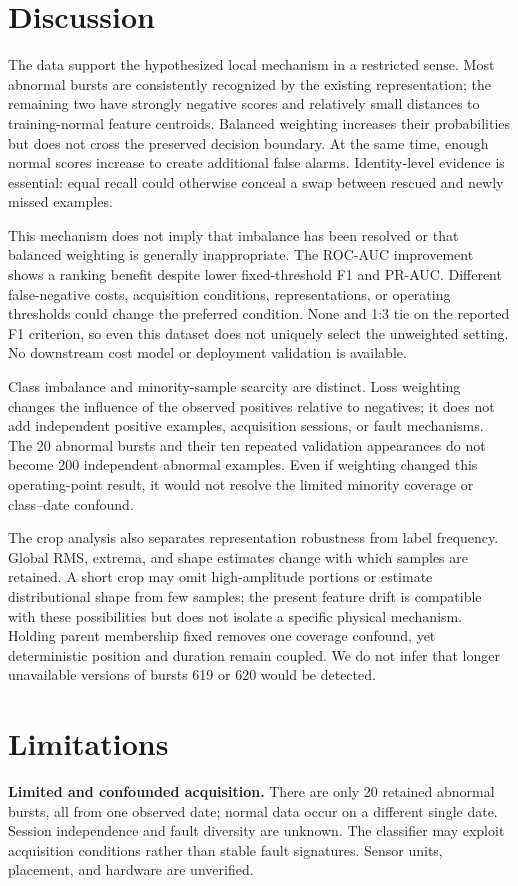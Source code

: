 \documentclass[10pt,twocolumn,letterpaper]{article}
\begin{document}
\section{Discussion}
The data support the hypothesized local mechanism in a restricted sense. Most abnormal bursts are consistently recognized by the existing representation; the remaining two have strongly negative scores and relatively small distances to training-normal feature centroids. Balanced weighting increases their probabilities but does not cross the preserved decision boundary. At the same time, enough normal scores increase to create additional false alarms. Identity-level evidence is essential: equal recall could otherwise conceal a swap between rescued and newly missed examples.

This mechanism does not imply that imbalance has been resolved or that balanced weighting is generally inappropriate. The ROC-AUC improvement shows a ranking benefit despite lower fixed-threshold F1 and PR-AUC. Different false-negative costs, acquisition conditions, representations, or operating thresholds could change the preferred condition. None and 1:3 tie on the reported F1 criterion, so even this dataset does not uniquely select the unweighted setting. No downstream cost model or deployment validation is available.

Class imbalance and minority-sample scarcity are distinct. Loss weighting changes the influence of the observed positives relative to negatives; it does not add independent positive examples, acquisition sessions, or fault mechanisms. The 20 abnormal bursts and their ten repeated validation appearances do not become 200 independent abnormal examples. Even if weighting changed this operating-point result, it would not resolve the limited minority coverage or class--date confound.

The crop analysis also separates representation robustness from label frequency. Global RMS, extrema, and shape estimates change with which samples are retained. A short crop may omit high-amplitude portions or estimate distributional shape from few samples; the present feature drift is compatible with these possibilities but does not isolate a specific physical mechanism. Holding parent membership fixed removes one coverage confound, yet deterministic position and duration remain coupled. We do not infer that longer unavailable versions of bursts 619 or 620 would be detected.

\section{Limitations}
\textbf{Limited and confounded acquisition.} There are only 20 retained abnormal bursts, all from one observed date; normal data occur on a different single date. Session independence and fault diversity are unknown. The classifier may exploit acquisition conditions rather than stable fault signatures. Sensor units, placement, and hardware are unverified.
\end{document}
